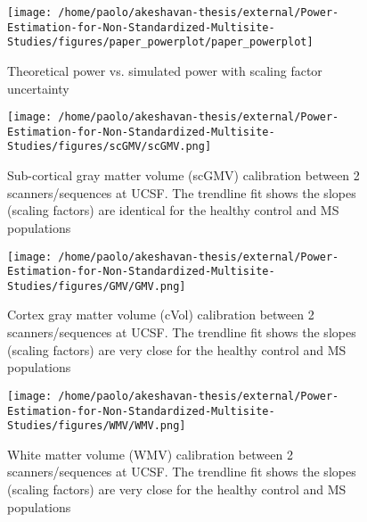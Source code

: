 \documentclass{article}
\begin{document}
\begin{figure}[]
\begin{center}
\texttt{[image: /home/paolo/akeshavan-thesis/external/Power-Estimation-for-Non-Standardized-Multisite-Studies/figures/paper\_powerplot/paper\_powerplot]}
\caption{ \protect\label{fig:powersim} Theoretical power vs. simulated power with scaling factor uncertainty}
\end{center}
\end{figure}


\begin{figure}[]
\begin{center}
\texttt{[image: /home/paolo/akeshavan-thesis/external/Power-Estimation-for-Non-Standardized-Multisite-Studies/figures/scGMV/scGMV.png]}
\caption{ \protect\label{fig:hcms_scGMV} Sub-cortical gray matter volume (scGMV) calibration between 2 scanners/sequences at UCSF. The trendline fit shows the slopes (scaling factors) are identical for the healthy control and MS populations}
\end{center}
\end{figure}


\begin{figure}[]
\begin{center}
\texttt{[image: /home/paolo/akeshavan-thesis/external/Power-Estimation-for-Non-Standardized-Multisite-Studies/figures/GMV/GMV.png]}
\caption{ \protect\label{fig:hcms_GMV} Cortex gray matter volume (cVol) calibration between 2 scanners/sequences at UCSF. The trendline fit shows the slopes (scaling factors) are very close for the healthy control and MS populations}
\end{center}
\end{figure}


\begin{figure}[]
\begin{center}
\texttt{[image: /home/paolo/akeshavan-thesis/external/Power-Estimation-for-Non-Standardized-Multisite-Studies/figures/WMV/WMV.png]}
\caption{ \protect\label{fig:hcms_WMV} White matter volume (WMV) calibration between 2 scanners/sequences at UCSF. The trendline fit shows the slopes (scaling factors) are very close for the healthy control and MS populations}
\end{center}
\end{figure}
\end{document}
